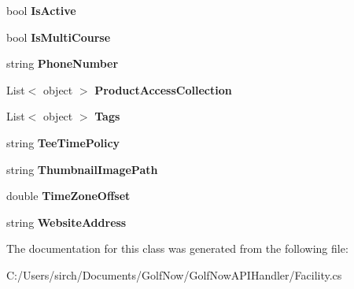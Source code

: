 \begin{DoxyCompactItemize}
\item 
\mbox{\label{class_golf_now_a_p_i_1_1_facility_a30c5c9b3bb965bbf43349afcee0b2d2d}} 
bool {\bfseries Is\+Active}
\item 
\mbox{\label{class_golf_now_a_p_i_1_1_facility_ad1fe80dcdc970efffb6dfe65407360e8}} 
bool {\bfseries Is\+Multi\+Course}
\item 
\mbox{\label{class_golf_now_a_p_i_1_1_facility_a2b00f03bdfd354e0cbbdb684280a2130}} 
string {\bfseries Phone\+Number}
\item 
\mbox{\label{class_golf_now_a_p_i_1_1_facility_aa440101ee47a64b9816dc8816857e04f}} 
List$<$ object $>$ {\bfseries Product\+Access\+Collection}
\item 
\mbox{\label{class_golf_now_a_p_i_1_1_facility_a9aab9888c7ef849009b8a10ca12885f4}} 
List$<$ object $>$ {\bfseries Tags}
\item 
\mbox{\label{class_golf_now_a_p_i_1_1_facility_a467e0f6c7492dde9098ee9c3134c65a2}} 
string {\bfseries Tee\+Time\+Policy}
\item 
\mbox{\label{class_golf_now_a_p_i_1_1_facility_a3045d37a2dc690a9bff5d81c5b7628ea}} 
string {\bfseries Thumbnail\+Image\+Path}
\item 
\mbox{\label{class_golf_now_a_p_i_1_1_facility_a78d91c7db9669efe7109289bbdb61466}} 
double {\bfseries Time\+Zone\+Offset}
\item 
\mbox{\label{class_golf_now_a_p_i_1_1_facility_a5f6b6464945004ab3035a1a147843994}} 
string {\bfseries Website\+Address}
\end{DoxyCompactItemize}


The documentation for this class was generated from the following file\+:\begin{DoxyCompactItemize}
\item 
C\+:/\+Users/sirch/\+Documents/\+Golf\+Now/\+Golf\+Now\+A\+P\+I\+Handler/Facility.\+cs\end{DoxyCompactItemize}
